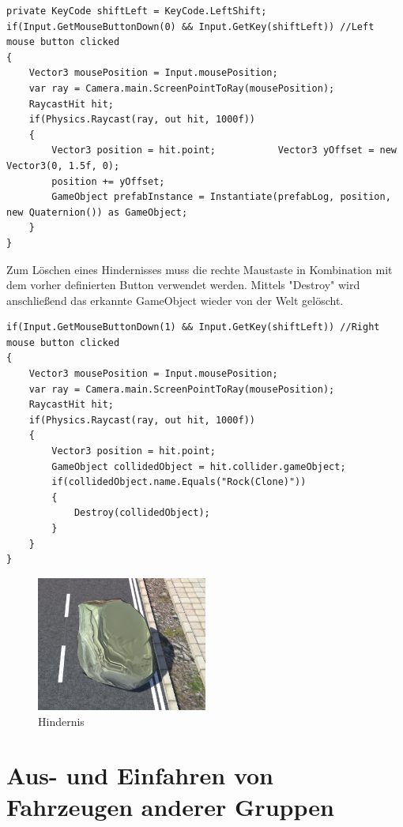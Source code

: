 \begin{lstlisting}[caption={Erstellen des Hindernisses},label={lst:Hinderniss_erstellen}]
private KeyCode shiftLeft = KeyCode.LeftShift;
if(Input.GetMouseButtonDown(0) && Input.GetKey(shiftLeft)) //Left mouse button clicked
{
	Vector3 mousePosition = Input.mousePosition;
	var ray = Camera.main.ScreenPointToRay(mousePosition);
	RaycastHit hit;
	if(Physics.Raycast(ray, out hit, 1000f))
	{
		Vector3 position = hit.point;			Vector3 yOffset = new Vector3(0, 1.5f, 0);
		position += yOffset;			
		GameObject prefabInstance = Instantiate(prefabLog, position, new Quaternion()) as GameObject;
	}
}
\end{lstlisting}

Zum Löschen eines Hindernisses muss die rechte Maustaste in Kombination mit dem vorher definierten Button verwendet werden. Mittels "Destroy" wird anschließend das erkannte GameObject wieder von der Welt gelöscht.

\begin{lstlisting}[caption={Zerstören des Hindernisses},label={lst:Hinderniss_zerstören}]
if(Input.GetMouseButtonDown(1) && Input.GetKey(shiftLeft)) //Right mouse button clicked
{
	Vector3 mousePosition = Input.mousePosition;
	var ray = Camera.main.ScreenPointToRay(mousePosition);
	RaycastHit hit;
	if(Physics.Raycast(ray, out hit, 1000f))
	{
		Vector3 position = hit.point;
		GameObject collidedObject = hit.collider.gameObject;
		if(collidedObject.name.Equals("Rock(Clone)"))
		{
			Destroy(collidedObject);
		}
	}
}
\end{lstlisting}

\begin{figure}[H]
\begin{center}
\includegraphics[width=0.5\textwidth]{BilderAllgemein/rock.PNG}
\end{center}
	\caption{Hindernis}
	\label{img:hindernis}
\end{figure}

\section{Aus- und Einfahren von Fahrzeugen anderer Gruppen}
\label{Aus- und Einfahren von Fahrzeugen anderer Gruppen}

